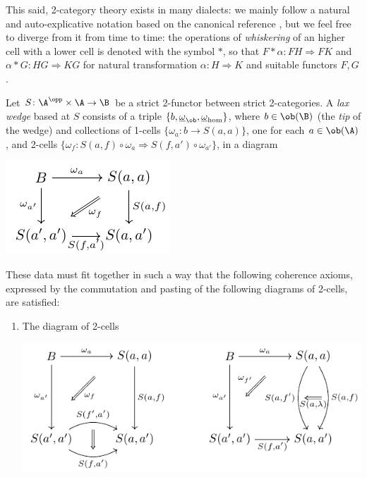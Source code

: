 This said, 2-category theory exists in many dialects: we mainly follow a natural and auto-explicative notation based on the canonical reference \cite{2catlimits}, but we feel free to diverge from it from time to time: the operations of \emph{whiskering} of an higher cell with a lower cell is denoted with the symbol $*$, so that $F * \alpha \colon FH\Rightarrow FK$ and $\alpha*G \colon HG\Rightarrow KG$ for natural transformation $\alpha\colon H \Rightarrow K$ and suitable functors $F,G$.
\begin{definition}\label{laxwedge}
Let $S\colon \A^\opp\times \A \to \B$ be a strict 2-functor between strict 2-categories. A \emph{lax wedge} based at $S$ consists of a triple $\{b, \underline{\omega}_{\ob}, \underline{\omega}_{\hom}\}$, where $b\in \ob(\B)$ (the \emph{tip} of the wedge) and collections of 1-cells $\big\{ \omega_a\colon b\to S(a,a)\big\}$, one for each $a\in \ob(\A)$, and 2-cells $\big\{ \omega_f\colon S(a, f)\circ \omega_{a} \Rightarrow S(f, a')\circ \omega_{a'} \big\}$, in a diagram
\begin{center}
\includegraphics[scale=1]{figures/fig14}
\end{center}
These data must fit together in such a way that the following coherence axioms, expressed by the commutation and pasting of the following diagrams of 2-cells, are satisfied:
\begin{enumerate}[label=(\oldstylenums{\arabic*})]
\item The diagram of 2-cells
\begin{center}
\includegraphics[scale=1]{figures/fig15}
\end{center}

\end{enumerate}
\end{definition}
